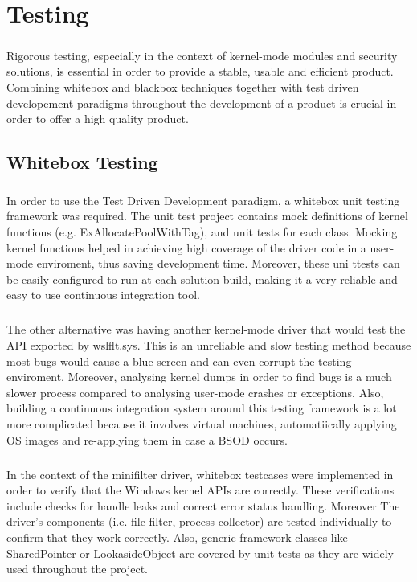 \chapter{Testing}
    \paragraph{}
    Rigorous testing, especially in the context of kernel-mode modules and security solutions, is essential in order to provide a stable,
    usable and efficient product. Combining whitebox and blackbox techniques together with test driven developement paradigms throughout
    the development of a product is crucial in order to offer a high quality product.
    
    \section{Whitebox Testing}
        \paragraph{}
        In order to use the Test Driven Development paradigm, a whitebox unit testing framework was required. The unit test project contains
        mock definitions of kernel functions (e.g. ExAllocatePoolWithTag), and unit tests for each class. Mocking kernel functions helped in
        achieving high coverage of the driver code in a user-mode enviroment, thus saving development time. Moreover, these uni ttests can be
        easily configured to run at each solution build, making it a very reliable and easy to use continuous integration tool.
        
        \paragraph{}
        The other alternative was having another kernel-mode driver that would test the API exported by wslflt.sys. This is an unreliable
        and slow testing method because most bugs would cause a blue screen and can even corrupt the testing enviroment. Moreover, analysing
        kernel dumps in order to find bugs is a much slower process compared to analysing user-mode crashes or exceptions. Also, building a
        continuous integration system around this testing framework is a lot more complicated because it involves virtual machines,
        automatiically applying OS images and re-applying them in case a BSOD occurs.

        \paragraph{}
        In the context of the minifilter driver, whitebox testcases were implemented in order to verify that the Windows kernel APIs are
        correctly. These verifications include checks for handle leaks and correct error status handling. Moreover The driver's components
        (i.e. file filter, process collector) are tested individually to confirm that they work correctly. Also, generic framework classes like
        SharedPointer or LookasideObject are covered by unit tests as they are widely used throughout the project.
    
